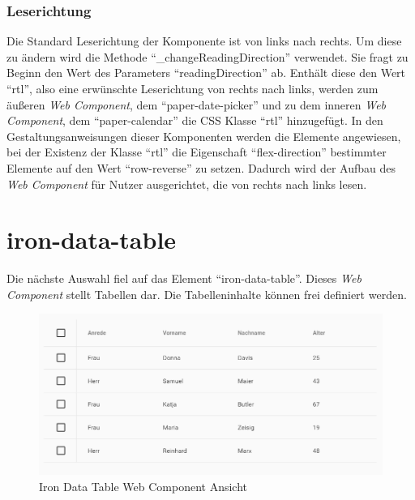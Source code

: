 \documentclass[12pt, paper=a4, bibtotoc, toc=listof, headsepline=true]{scrreprt}
\begin{document}
		\subsubsection{Leserichtung}
		Die Standard Leserichtung der Komponente ist von links nach rechts. Um diese zu ändern wird die Methode \enquote{\_changeReadingDirection} verwendet. Sie fragt zu Beginn den Wert des Parameters \enquote{readingDirection} ab.  Enthält diese den Wert \enquote{rtl}, also eine erwünschte Leserichtung von rechts nach links, werden zum äußeren \emph{Web Component}, dem \enquote{paper-date-picker} und zu dem inneren \emph{Web Component}, dem \enquote{paper-calendar} die \ac{CSS} Klasse \enquote{rtl} hinzugefügt. In den Gestaltungsanweisungen dieser Komponenten werden die Elemente angewiesen, bei der Existenz der Klasse \enquote{rtl} die Eigenschaft \enquote{flex-direction} bestimmter Elemente auf den Wert \enquote{row-reverse} zu setzen. Dadurch wird der Aufbau des \emph{Web Component} für Nutzer ausgerichtet, die von rechts nach links lesen.
		\newpage
		\section{iron-data-table}
		Die nächste Auswahl fiel auf das Element \enquote{iron-data-table}. Dieses \emph{Web Component} stellt Tabellen dar. Die Tabelleninhalte können frei definiert werden.
		\begin{figure}[H]		
			\centering
			\includegraphics[width=\textwidth,height=\textheight,keepaspectratio]{datTab.png}
			\caption[Iron Data Table]{Iron Data Table Web Component Ansicht}
			\label{img:datTab}
		\end{figure}
\end{document}
